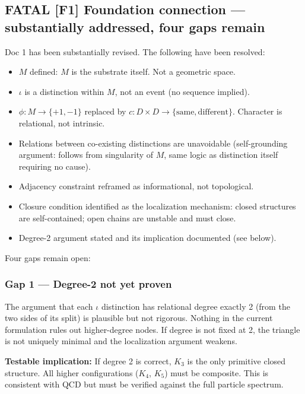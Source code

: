 \documentclass[11pt,letterpaper]{article}
\begin{document}
\subsection{{\bfseries\sffamily FATAL} [F1] Foundation connection --- substantially addressed, four gaps remain}
\label{sec:org74fc5dd}
Doc 1 has been substantially revised. The following have been resolved:

\begin{itemize}
\item[{$\boxtimes$}] \(M\) defined: \(M\) is the substrate itself. Not a geometric space.
\item[{$\boxtimes$}] \(\iota\) is a distinction within \(M\), not an event (no sequence implied).
\item[{$\boxtimes$}] \(\phi: M \to \{+1,-1\}\) replaced by \(c: D \times D \to \{\mathrm{same}, \mathrm{different}\}\). Character is relational, not intrinsic.
\item[{$\boxtimes$}] Relations between co-existing distinctions are unavoidable (self-grounding argument: follows from singularity of \(M\), same logic as distinction itself requiring no cause).
\item[{$\boxtimes$}] Adjacency constraint reframed as informational, not topological.
\item[{$\boxtimes$}] Closure condition identified as the localization mechanism: closed structures are self-contained; open chains are unstable and must close.
\item[{$\boxtimes$}] Degree-2 argument stated and its implication documented (see below).
\end{itemize}

Four gaps remain open:

\subsubsection{Gap 1 --- Degree-2 not yet proven}
\label{sec:org7af9d59}

The argument that each \(\iota\) distinction has relational degree exactly 2 (from the two sides of its split) is plausible but not rigorous. Nothing in the current formulation rules out higher-degree nodes. If degree is not fixed at 2, the triangle is not uniquely minimal and the localization argument weakens.

\textbf{Testable implication:} If degree 2 is correct, \(K_3\) is the only primitive closed structure. All higher configurations (\(K_4\), \(K_5\)) must be composite. This is consistent with QCD but must be verified against the full particle spectrum.
\end{document}
